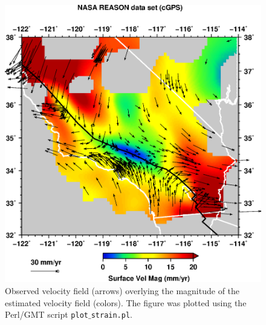 \documentclass[11pt,titlepage,fleqn]{article}
\begin{document}
\begin{figure}
\includegraphics[width=16cm]{socal_d01_q03_q07_b1_2D_s1_u1_vfield.eps}
\caption[]
{{
Observed velocity field (arrows) overlying the magnitude of the estimated velocity field (colors).
The figure was plotted using the Perl/GMT script {\tt plot$\_$strain.pl}.
\label{fig:2D_gmt1}
}}
\end{figure}
\end{document}
